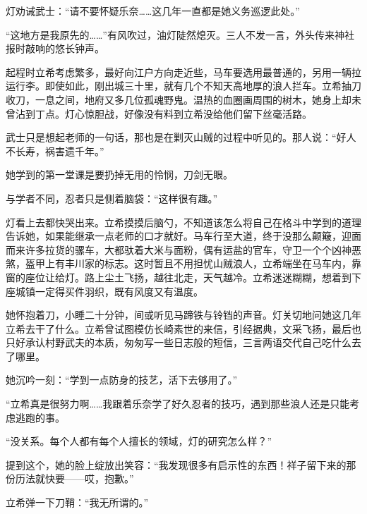 \documentclass{article}
\begin{document}
灯劝诫武士：“请不要怀疑乐奈……这几年一直都是她义务巡逻此处。”



“这地方是我原先的……”有风吹过，油灯陡然熄灭。三人不发一言，外头传来神社报时敲响的悠长钟声。



起程时立希考虑繁多，最好向江户方向走近些，马车要选用最普通的，另用一辆拉运行李。即使如此，刚出城三十里，就有几个不知天高地厚的浪人拦车。立希抽刀收刀，一息之间，地府又多几位孤魂野鬼。温热的血圈画周围的树木，她身上却未曾沾到丁点。灯心惊胆战，好像没有料到立希没给他们留下丝毫活路。



武士只是想起老师的一句话，那也是在剿灭山贼的过程中听见的。那人说：“好人不长寿，祸害遗千年。”



她学到的第一堂课是要扔掉无用的怜悯，刀剑无眼。



与学者不同，忍者只是侧着脑袋：“这样很有趣。”



灯看上去都快哭出来。立希摸摸后脑勺，不知道该怎么将自己在格斗中学到的道理告诉她，如果能继承一点老师的口才就好。马车行至大道，终于没那么颠簸，迎面而来许多拉货的骡车，大都驮着大米与面粉，偶有运盐的官车，守卫一个个凶神恶煞，盔甲上有丰川家的标志。这时暂且不用担忧山贼浪人，立希端坐在马车内，靠窗的座位让给灯。路上尘土飞扬，越往北走，天气越冷。立希迷迷糊糊，想着到下座城镇一定得买件羽织，既有风度又有温度。



她怀抱着刀，小睡二十分钟，间或听见马蹄铁与铃铛的声音。灯关切地问她这几年立希去干了什么。立希曾试图模仿长崎素世的来信，引经据典，文采飞扬，最后也只好承认村野武夫的本质，匆匆写一些日志般的短信，三言两语交代自己吃什么去了哪里。



她沉吟一刻：“学到一点防身的技艺，活下去够用了。”



“立希真是很努力啊……我跟着乐奈学了好久忍者的技巧，遇到那些浪人还是只能考虑逃跑的事。



“没关系。每个人都有每个人擅长的领域，灯的研究怎么样？”



提到这个，她的脸上绽放出笑容：“我发现很多有启示性的东西！祥子留下来的那份历法就快要——哎，抱歉。”



立希弹一下刀鞘：“我无所谓的。”
\end{document}
